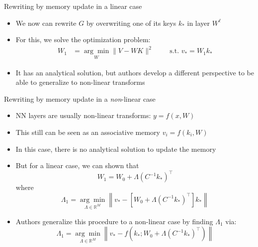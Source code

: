 \documentclass[handout, 10pt]{beamer}
\begin{document}
\begin{frame}{Rewriting by memory update in a linear case}
\begin{itemize}
    \item\pause We now can rewrite $G$ by overwriting one of its keys $k_*$ in layer $W^\ell$
    \item\pause For this, we solve the optimization problem:
    \begin{equation}
\begin{aligned}
W_{1} &=\underset{W}{\arg \min }\|V-W K\|^{2} \qquad\text { s.t. } v_{*} =W_{1} k_{*}
\end{aligned}
\end{equation}
    \item\pause It has an analytical solution, but authors develop a different perspective to be able to generalize to non-linear transforms
\end{itemize}
\end{frame}


\begin{frame}{Rewriting by memory update in a \textit{non}-linear case}
\begin{itemize}
    \item\pause NN layers are usually non-linear transforms: $y = f(x, W)$
    \item\pause This still can be seen as an associative memory $v_i = f(k_i, W)$
    \item\pause In this case, there is no analytical solution to update the memory
    \item\pause But for a linear case, we can shown that
\begin{equation}
W_{1}=W_{0}+\Lambda\left(C^{-1} k_{*}\right)^{\top}
\end{equation}
where
\begin{equation}
\Lambda_{1}=\underset{\Lambda \in \mathbb{R}^{M}}{\arg \min }\left\|v_{*}- [W_{0}+\Lambda (C^{-1} k_{*})^\top] k_*\right\|
\end{equation}
\item\pause Authors generalize this procedure to a non-linear case by finding $\Lambda_1$ via:
\begin{equation}
\Lambda_{1}=\underset{\Lambda \in \mathbb{R}^{M}}{\arg \min }\left\|v_{*}-f\left(k_{*} ; W_{0}+\Lambda (C^{-1} k_{*})^\top\right)\right\|
\end{equation}
\end{itemize}
\end{frame}
\end{document}
